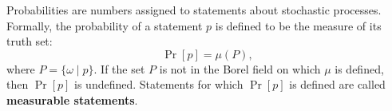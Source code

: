 Probabilities are numbers assigned to statements about stochastic processes. Formally, the probability of a statement $p$ is defined to be the measure of its truth set: $$\Pr[p] = \mu(P),$$ where $P = \{\omega \mid p\}$. If the set $P$ is not in the Borel field on which $\mu$ is defined, then $\Pr[p]$ is undefined. Statements for which $\Pr[p]$ is defined are called \textbf{measurable statements}.